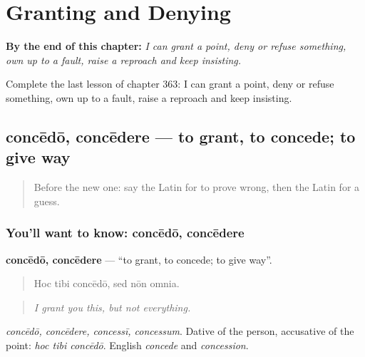 
\chapter{Granting and Denying}
\label{ch:la-granting-and-denying}

\begin{chapteropening}
\textbf{By the end of this chapter:} \emph{I can grant a point, deny or refuse something, own up to a fault, raise a reproach and keep insisting.}

Complete the last lesson of chapter 363: I can grant a point, deny or refuse something, own up to a fault, raise a reproach and keep insisting.
\end{chapteropening}

\section[concēdō, concēdere]{concēdō, concēdere — to grant, to concede; to give way}

\label{lesson:LA-C363-concedo}



\begin{quote}
Before the new one: say the Latin for to prove wrong, then the Latin for a guess.
\end{quote}

\subsection*{You'll want to know: concēdō, concēdere}
\textbf{concēdō, concēdere} — \textquotedblleft{}to grant, to concede; to give way\textquotedblright{}.

\begin{quote}
Hoc tibi concēdō, sed nōn omnia.
\end{quote}

\begin{quote}
\emph{I grant you this, but not everything.}
\end{quote}

\emph{concēdō, concēdere, concessī, concessum}. Dative of the person, accusative of the point: \emph{hoc tibi concēdō}. English \emph{concede} and \emph{concession}.

